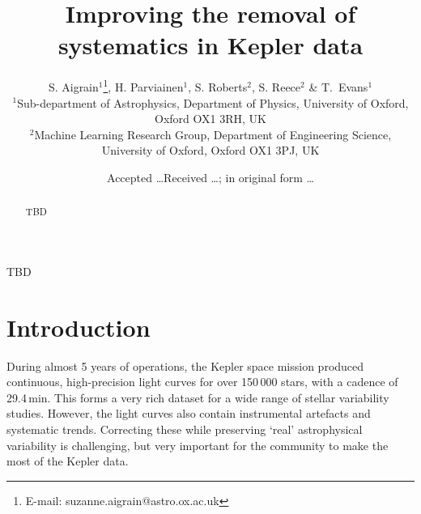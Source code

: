 \documentclass[useAMS,usenatbib]{mn2e}
\title{Improving the removal of systematics in Kepler data}
\author[S. Aigrain et al.]{S. Aigrain$^{1}$\thanks{E-mail:
    suzanne.aigrain@astro.ox.ac.uk}, H. Parviainen$^{1}$,
  S. Roberts$^{2}$, S. Reece$^{2}$ \& 
  T.\ Evans$^{1}$ \\
  $^{1}$Sub-department of Astrophysics, Department of Physics,
  University of Oxford, Oxford OX1 3RH, UK\\
  $^{2}$Machine Learning Research Group, Department of
  Engineering Science, University of Oxford, Oxford OX1 3PJ, UK}
\begin{document}
\date{Accepted \ldots Received \ldots; in original form \ldots}

\pagerange{\pageref{firstpage}--\pageref{lastpage}} 

\maketitle

\label{firstpage}

\begin{abstract}
TBD
\end{abstract}

\begin{keywords}
TBD
\end{keywords}

\section{Introduction}

During almost 5 years of operations, the Kepler space mission produced
continuous, high-precision light curves for over 150\,000 stars, with
a cadence of 29.4\,min. This forms a very rich dataset for a wide
range of stellar variability studies. However, the light curves also
contain instrumental artefacts and systematic trends. Correcting these while
preserving `real' astrophysical variability is challenging, but very
important for the community to make the most of the Kepler
data. 
\end{document}
